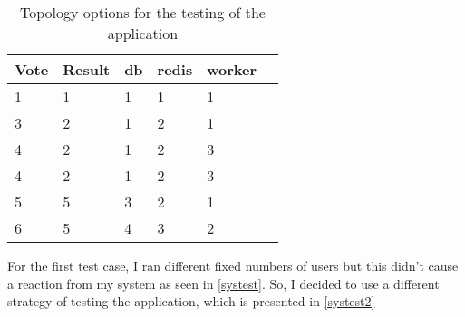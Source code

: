 \begin{table}[H]
\centering
\begin{tabular}{|l|l|l|l|l|l|}
\hline
 Vote & Result & db & redis & worker  \\ \hline
1 & 1 & 1 & 1 & 1  \\ \hline
3 & 2 & 1 &2 & 1  \\ \hline
4 & 2 & 1 & 2 & 3 \\ \hline
4 & 2 & 1 & 2 & 3  \\ \hline
5 & 5 & 3 & 2 & 1  \\ \hline
6 & 5 & 4 & 3 & 2  \\ \hline
\end{tabular}%
\caption{Topology options for the testing of the application}
\label{tops}
\end{table}

For the first test case, I ran different fixed numbers of users but this didn't cause a reaction from my system as seen in \autoref{systest}. So, I decided to use a different strategy of testing the application, which is presented in \autoref{systest2}   
\begin{table}[H]
\caption{Test case 1 run on the application.}
\label{systest}
\end{table}

